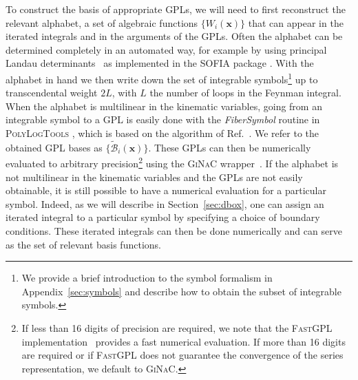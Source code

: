 \documentclass[a4paper,11pt]{article}
\begin{document}
To construct the basis of appropriate GPLs, we will need to first reconstruct the relevant alphabet, a set of algebraic functions $\{W_i(\mathbf{x})\}$ that can appear in the iterated integrals and in the arguments of the GPLs.  Often the alphabet can be determined completely in an automated way, for example by using principal Landau determinants~\cite{Fevola:2023fzn} as implemented in the \textsc{SOFIA} package \cite{Correia:2025yao}. With the alphabet in hand we then write down the set of integrable symbols\footnote{We provide a brief introduction to the symbol formalism in Appendix~\ref{sec:symbols} and describe how to obtain the subset of integrable symbols.} up to transcendental weight $2 L$, with $L$ the number of loops in the Feynman integral. When the alphabet is multilinear in the kinematic variables, going from an integrable symbol to a GPL is easily done with the \textit{FiberSymbol} routine in \textsc{PolyLogTools} \cite{Duhr:2019tlz}, which is based on the algorithm of Ref.~\cite{Anastasiou:2013srw}. We refer to the obtained GPL bases as $\{\tilde{\mathcal{B}}_i(\mathbf{x})\}$. These GPLs can then be numerically evaluated to arbitrary precision\footnote{If less than 16 digits of precision are required, we note that the \textsc{FastGPL} implementation~\cite{Wang:2021imw} provides a fast numerical evaluation. If more than 16 digits are required or if \textsc{FastGPL} does not guarantee the convergence of the series representation, we default to \textsc{GiNaC}.} using the \textsc{GiNaC} wrapper~\cite{Bauer:2002, Vollinga:2004sn}. If the alphabet is not multilinear in the kinematic variables and the GPLs are not easily obtainable, it is still possible to have a numerical evaluation for a particular symbol. Indeed, as we will describe in Section~\ref{sec:dbox}, one can assign an iterated integral to a particular symbol by specifying a choice of boundary conditions. These iterated integrals can then be done numerically and can serve as the set of relevant basis functions. 
\end{document}
